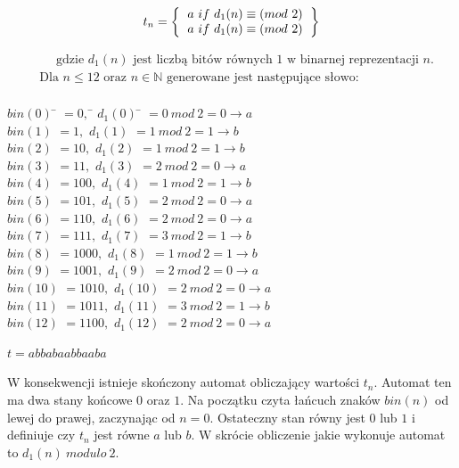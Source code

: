\documentclass[document]{xmgr}
\begin{document}
\[
t_n=
\left \{
\begin{tabular}{ccc}
$a\ if\ d_1(n) \equiv (mod\ 2)$ \\
$a\ if\ d_1(n) \equiv (mod\ 2)$
\end{tabular}
\right \}
\]

\begin{align*}
  &\phantom{{}\leq{}} \text{gdzie } d_1(n) \text{ jest liczbą bitów równych 1 w binarnej reprezentacji } n \text{.}  \\
  & \text{Dla } n \leq 12 \text{ oraz } n \in \mathbb{N} \text{ generowane jest następujące słowo:}  \\
\end{align*}

\begin{tabbing}
$bin(0)$\hspace{1em} \= $= 0,$\hspace{7em} \= $d_1 (0)$\hspace{1em} \= $= 0\ mod\ 2 = 0 \to a$ \\
$bin(1)$ \> $= 1,$ \> $d_1 (1)$ \> $= 1\ mod\ 2 = 1 \to b$\\
$bin(2)$ \> $= 10,$ \> $d_1 (2)$ \> $= 1\ mod\ 2 = 1 \to b$\\
$bin(3)$ \> $= 11,$ \> $d_1 (3)$ \> $= 2\ mod\ 2 = 0 \to a$\\
$bin(4)$ \> $= 100,$ \> $d_1 (4)$ \> $= 1\ mod\ 2 = 1 \to b$\\
$bin(5)$ \> $= 101,$ \> $d_1 (5)$ \> $= 2\ mod\ 2 = 0 \to a$\\
$bin(6)$ \> $= 110,$ \> $d_1 (6)$ \> $= 2\ mod\ 2 = 0 \to a$\\
$bin(7)$ \> $= 111,$ \> $d_1 (7)$ \> $= 3\ mod\ 2 = 1 \to b$\\
$bin(8)$ \> $= 1000,$ \> $d_1 (8)$ \> $= 1\ mod\ 2 = 1 \to b$\\
$bin(9)$ \> $= 1001,$ \> $d_1 (9)$ \> $= 2\ mod\ 2 = 0 \to a$\\
$bin(10)$ \> $= 1010,$	\> $d_1 (10)$ \> $= 2\ mod\ 2 = 0 \to a$\\
$bin(11)$ \> $= 1011,$ 	\> $d_1 (11)$ \> $= 3\ mod\ 2 = 1 \to b$\\
$bin(12)$ \> $= 1100,$ 	\> $d_1 (12)$ \> $= 2\ mod\ 2 = 0 \to a$
\end{tabbing}

{\centering $t = abbabaabbaaba$ \par}

W konsekwencji istnieje skończony automat obliczający wartości $t_n$. Automat ten ma dwa stany końcowe $0$ oraz $1$. Na początku czyta łańcuch znaków $bin(n)$ od lewej do prawej, zaczynając od $n = 0$. Ostateczny stan równy jest $0$ lub $1$ i definiuje czy $t_n$ jest równe $a$ lub $b$. W skrócie obliczenie jakie wykonuje automat to $d_1(n)\ modulo\ 2$.
\end{document}
